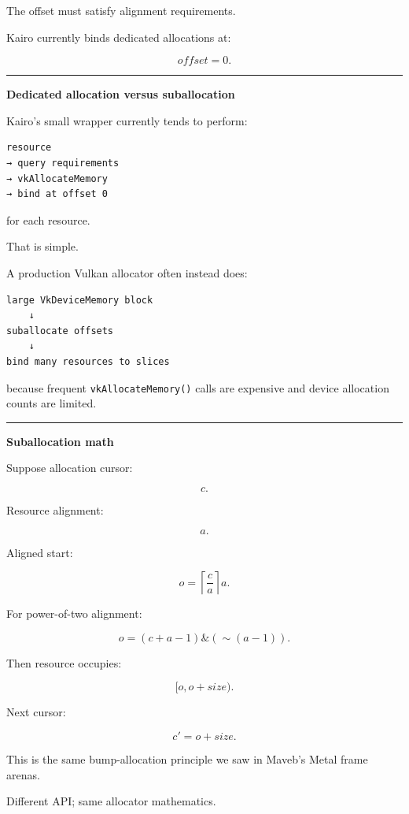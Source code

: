 The offset must satisfy alignment requirements.

Kairo currently binds dedicated allocations at:

\[
offset=0.
\]

\begin{center}\rule{0.5\linewidth}{0.5pt}\end{center}

\textbf{Dedicated allocation versus suballocation}

Kairo's small wrapper currently tends to perform:

\begin{verbatim}
resource
→ query requirements
→ vkAllocateMemory
→ bind at offset 0
\end{verbatim}

for each resource.

That is simple.

A production Vulkan allocator often instead does:

\begin{verbatim}
large VkDeviceMemory block
    ↓
suballocate offsets
    ↓
bind many resources to slices
\end{verbatim}

because frequent \texttt{vkAllocateMemory()} calls are expensive and device allocation counts are limited.

\begin{center}\rule{0.5\linewidth}{0.5pt}\end{center}

\textbf{Suballocation math}

Suppose allocation cursor:

\[
c.
\]

Resource alignment:

\[
a.
\]

Aligned start:

\[
\boxed{
o=
\left\lceil
\frac ca
\right\rceil a.
}
\]

For power-of-two alignment:

\[
\boxed{
o=
(c+a-1)\&( \sim(a-1)).
}
\]

Then resource occupies:

\[
[o,o+size).
\]

Next cursor:

\[
c'=o+size.
\]

This is the same bump-allocation principle we saw in Maveb's Metal frame arenas.

Different API; same allocator mathematics.

